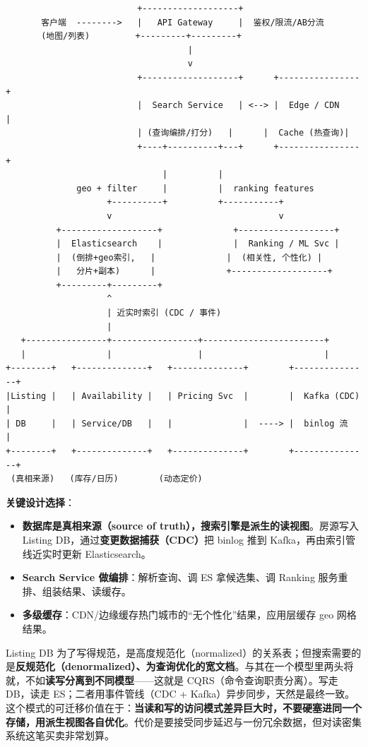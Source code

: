 \begin{lstlisting}
                          +-------------------+
       客户端  -------->   |   API Gateway     |  鉴权/限流/AB分流
       (地图/列表)         +---------+---------+
                                    |
                                    v
                          +-------------------+      +----------------+
                          |  Search Service   | <--> |  Edge / CDN    |
                          | (查询编排/打分)   |      |  Cache (热查询)|
                          +----+----------+---+      +----------------+
                               |          |
              geo + filter     |          |  ranking features
                    +----------+          +-----------+
                    v                                 v
          +-------------------+              +-------------------+
          |  Elasticsearch    |              |  Ranking / ML Svc |
          |  (倒排+geo索引,   |              |  (相关性, 个性化) |
          |   分片+副本)      |              +-------------------+
          +---------+---------+
                    ^
                    | 近实时索引 (CDC / 事件)
                    |
   +----------------+-----------------+------------------------+
   |                |                 |                        |
+--------+   +--------------+   +--------------+        +---------------+
|Listing |   | Availability |   | Pricing Svc  |        |  Kafka (CDC)  |
| DB     |   | Service/DB   |   |              |  ----> |  binlog 流    |
+--------+   +--------------+   +--------------+        +---------------+
 (真相来源)   (库存/日历)        (动态定价)
\end{lstlisting}

\textbf{关键设计选择}：

\begin{itemize}
  \item \textbf{数据库是真相来源（source of truth），搜索引擎是派生的读视图}。房源写入 Listing DB，通过\textbf{变更数据捕获（CDC）}把 binlog 推到 Kafka，再由索引管线近实时更新 Elasticsearch。
  \item \textbf{Search Service 做编排}：解析查询、调 ES 拿候选集、调 Ranking 服务重排、组装结果、读缓存。
  \item \textbf{多级缓存}：CDN/边缘缓存热门城市的“无个性化”结果，应用层缓存 geo 网格结果。
\end{itemize}

\begin{idea}
Listing DB 为了写得规范，是高度规范化（normalized）的关系表；但搜索需要的是\textbf{反规范化（denormalized）、为查询优化的宽文档}。与其在一个模型里两头将就，不如\textbf{读写分离到不同模型}——这就是 CQRS（命令查询职责分离）。写走 DB，读走 ES；二者用事件管线（CDC + Kafka）异步同步，天然是最终一致。这个模式的可迁移价值在于：\textbf{当读和写的访问模式差异巨大时，不要硬塞进同一个存储，用派生视图各自优化}。代价是要接受同步延迟与一份冗余数据，但对读密集系统这笔买卖非常划算。
\end{idea}

